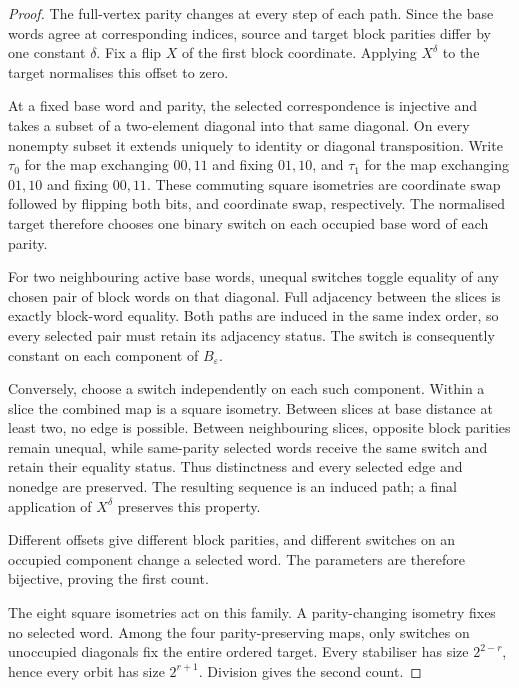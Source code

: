 \documentclass[11pt,a4paper]{article}
\theoremstyle{definition}
\theoremstyle{remark}
\begin{document}
\begin{proof}
The full-vertex parity changes at every step of each path. Since the
base words agree at corresponding indices, source and target block
parities differ by one constant $\delta$. Fix a flip $X$ of the first
block coordinate. Applying $X^\delta$ to the target normalises this
offset to zero.

At a fixed base word and parity, the selected correspondence is
injective and takes a subset of a two-element diagonal into that
same diagonal. On every nonempty subset it extends uniquely to
identity or diagonal transposition. Write $\tau_0$ for the map
exchanging $00,11$ and fixing $01,10$, and $\tau_1$ for the map
exchanging $01,10$ and fixing $00,11$. These commuting square
isometries are coordinate swap followed by flipping both bits,
and coordinate swap, respectively. The normalised target therefore
chooses one binary switch on each occupied base word of each parity.

For two neighbouring active base words, unequal switches toggle
equality of any chosen pair of block words on that diagonal.
Full adjacency between the slices is exactly block-word equality.
Both paths are induced in the same index order, so every selected
pair must retain its adjacency status. The switch is consequently
constant on each component of $B_\varepsilon$.

Conversely, choose a switch independently on each such component.
Within a slice the combined map is a square isometry. Between
slices at base distance at least two, no edge is possible. Between
neighbouring slices, opposite block parities remain unequal, while
same-parity selected words receive the same switch and retain their
equality status. Thus distinctness and every selected edge and
nonedge are preserved. The resulting sequence is an induced path;
a final application of $X^\delta$ preserves this property.

Different offsets give different block parities, and different
switches on an occupied component change a selected word. The
parameters are therefore bijective, proving the first count.

The eight square isometries act on this family. A parity-changing
isometry fixes no selected word. Among the four parity-preserving
maps, only switches on unoccupied diagonals fix the entire ordered
target. Every stabiliser has size $2^{2-r}$, hence every orbit has
size $2^{r+1}$. Division gives the second count.
\end{proof}
\end{document}
